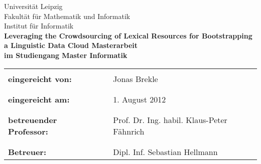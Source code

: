 \documentclass[a4paper]{scrartcl}
\newcommand{\NAME}{Leveraging the Crowdsourcing of Lexical Resources for Bootstrapping a Linguistic Data Cloud}
\newcommand{\TITLE}{\NAME}
\begin{document}
\begin{titlepage}
\vspace{2 cm}
\thispagestyle{empty}
\begin{center}
\Large{
Universität Leipzig\\
Fakultät für Mathematik und Informatik\\
Institut für Informatik\\
}
\vspace{3 cm}
\textbf{
	\Large{
	\TITLE
	}
}
\vspace{2 cm}
\textbf{
Masterarbeit\\
im Studiengang Master Informatik
}
\end{center}
\vspace{6 cm}

\begin{flushleft}
\begin{tabular}{lll}
& & \\
\textbf{eingereicht von:} & & Jonas Brekle\\
& & \\
& & \\
\textbf{eingereicht am:} & & 1. August 2012\\
& & \\
& & \\
\textbf{betreuender Professor:} & & Prof. Dr. Ing. habil. Klaus-Peter Fähnrich\\
& & \\
& & \\
\textbf{Betreuer:} & & Dipl. Inf. Sebastian Hellmann
\end{tabular}
\end{flushleft}
\end{titlepage}
\end{document}

